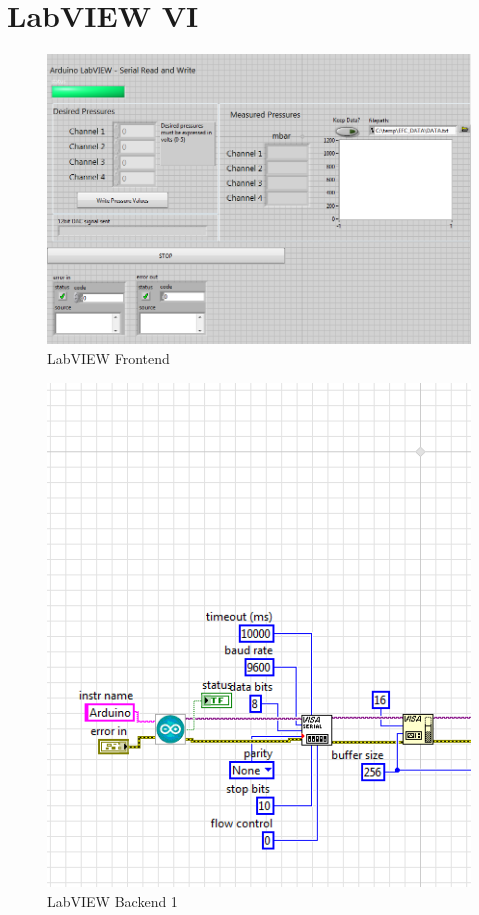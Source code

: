 \chapter{LabVIEW VI}

\begin{figure}[h]
\centering 
\includegraphics[width=1.0\columnwidth]{frontend.PNG} 
\caption[LabVIEW Frontend]{LabVIEW Frontend} 
\label{fig:frontend} 
\end{figure}

\begin{figure}[h]
\centering 
\includegraphics[width=0.60\columnwidth]{backend11.PNG} 
\caption[LabVIEW Backend 1]{LabVIEW Backend 1 } 
\label{fig:backend11} 
\end{figure}

